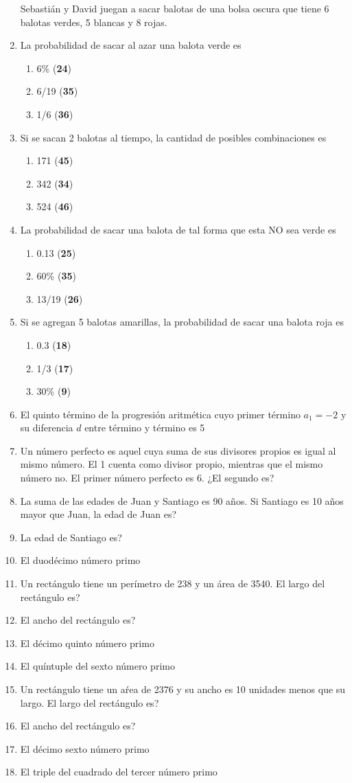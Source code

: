 \documentclass[letterpaper,twoside]{article}
\begin{document}
\begin{multicols}{2}
\begin{enumerate}
Sebastián y David juegan a sacar balotas de una bolsa oscura que tiene 6 balotas verdes, 5 blancas y 8 rojas.
\item La probabilidad de sacar al azar una balota verde es
\begin{enumerate}
\item 6\% (\textbf{24})
\item 6/19 (\textbf{35})
\item 1/6 (\textbf{36})
\end{enumerate}
\item Si se sacan 2 balotas al tiempo, la cantidad de posibles combinaciones es
\begin{enumerate}
\item 171 (\textbf{45})
\item 342 (\textbf{34})
\item 524 (\textbf{46})
\end{enumerate}
\item La probabilidad de sacar una balota de tal forma que esta NO sea verde es
\begin{enumerate}
\item 0.13 (\textbf{25})
\item 60\% (\textbf{35})
\item 13/19 (\textbf{26})
\end{enumerate}
\item Si se agregan 5 balotas amarillas, la probabilidad de sacar una balota roja es
\begin{enumerate}
\item 0.3 (\textbf{18})
\item 1/3 (\textbf{17})
\item 30\% (\textbf{9})
\end{enumerate}
\item El quinto término de la progresión aritmética cuyo primer término $a_{1}=-2$ y su diferencia $d$ entre término y término es 5
\item Un número perfecto es aquel cuya suma de sus divisores propios es igual al mismo número. El 1 cuenta como divisor propio, mientras que el mismo número no. El primer número perfecto es 6. ¿El segundo es?
\item La suma de las edades de Juan y Santiago es 90 años. Si Santiago es 10 años mayor que Juan, la edad de Juan es?
\item La edad de Santiago es?
\item El duodécimo número primo
\item Un rectángulo tiene un perímetro de 238 y un área de 3540. El largo del rectángulo es?
\item El ancho del rectángulo es?
\item El décimo quinto número primo
\item El quíntuple del sexto número primo
\item Un rectángulo tiene un aŕea de 2376 y su ancho es 10 unidades menos que su largo. El largo del rectángulo es?
\item El ancho del rectángulo es?
\item El décimo sexto número primo
\item El triple del cuadrado del tercer número primo


\end{enumerate}
\end{multicols}
\end{document}
